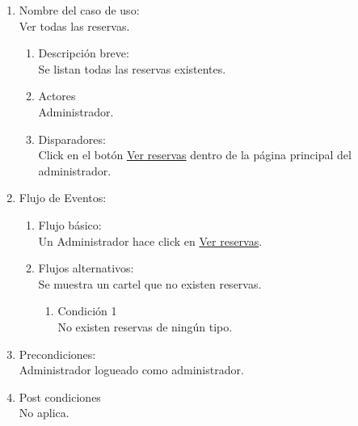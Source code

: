 \documentclass[a4paper,11pt]{article}
\begin{document}
\begin{enumerate}

    \item Nombre del caso de uso: \\
    Ver todas las reservas.

    \begin{enumerate}
    \item Descripción breve: \\
        Se listan todas las reservas existentes.
    \item Actores \\
        Administrador.
    \item Disparadores: \\
        Click en el botón \underline{Ver reservas} dentro de la
        página principal del administrador.
    \end{enumerate}

    \item Flujo de Eventos: \\

    \begin{enumerate}

        \item Flujo básico:\\
            Un Administrador hace click en \underline{Ver reservas}.
        \item Flujos alternativos:\\
            Se muestra un cartel que no existen reservas.
            \begin{enumerate}
                \item Condición 1 \\
                    No existen reservas de ningún tipo.
            \end{enumerate}

    \end{enumerate}

    \item Precondiciones: \\
        Administrador logueado como administrador.

    \item Post condiciones \\
        No aplica.

\end{enumerate}
\end{document}
